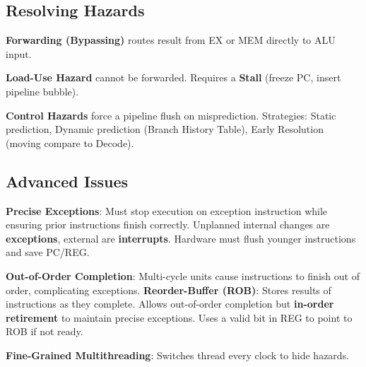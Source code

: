 \subsection{Resolving Hazards}

\begin{lemma}
\textbf{Forwarding (Bypassing)} routes result from EX or MEM directly to ALU input.
\end{lemma}

\begin{important}
\textbf{Load-Use Hazard} cannot be forwarded. Requires a \textbf{Stall} (freeze PC, insert pipeline bubble).
\end{important}

\begin{remark}
\textbf{Control Hazards} force a pipeline flush on misprediction. Strategies: Static prediction, Dynamic prediction (Branch History Table), Early Resolution (moving compare to Decode).
\end{remark}

\subsection{Advanced Issues}

\begin{definition}
\textbf{Precise Exceptions}: Must stop execution on exception instruction while ensuring prior instructions finish correctly. Unplanned internal changes are \textbf{exceptions}, external are \textbf{interrupts}. Hardware must flush younger instructions and save PC/REG.
\end{definition}

\begin{definition}
\textbf{Out-of-Order Completion}: Multi-cycle units cause instructions to finish out of order, complicating exceptions.
\textbf{Reorder-Buffer (ROB)}: Stores results of instructions as they complete. Allows out-of-order completion but \textbf{in-order retirement} to maintain precise exceptions. Uses a valid bit in REG to point to ROB if not ready.
\end{definition}

\begin{definition}
\textbf{Fine-Grained Multithreading}: Switches thread every clock to hide hazards.
\end{definition}
